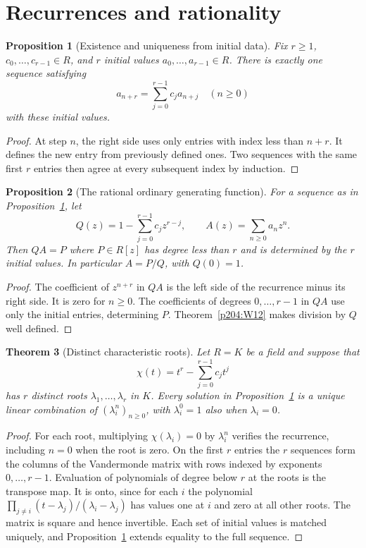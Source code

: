 \documentclass[11pt,oneside,openany]{book}
\theoremstyle{plain}
\newtheorem{theorem}{Theorem}[chapter]
\newtheorem{proposition}[theorem]{Proposition}
\theoremstyle{definition}
\theoremstyle{remark}
\begin{document}
\section{Recurrences and rationality}

\begin{proposition}[Existence and uniqueness from initial data]
\label{p204:W13}
Fix \(r\ge1\), \(c_0,\ldots,c_{r-1}\in R\), and \(r\) initial
values \(a_0,\ldots,a_{r-1}\in R\). There is exactly one sequence
satisfying
\[
 a_{n+r}=\sum_{j=0}^{r-1}c_j a_{n+j}\quad(n\ge0)
\]
with these initial values.
\end{proposition}
\begin{proof}
At step \(n\), the right side uses only entries with index
less than \(n+r\). It defines the new entry from previously
defined ones. Two sequences with the same first \(r\) entries
then agree at every subsequent index by induction.
\end{proof}

\begin{proposition}[The rational ordinary generating function]
\label{p204:W14}
For a sequence as in Proposition~\ref{p204:W13}, let
\[
 Q(z)=1-\sum_{j=0}^{r-1}c_jz^{r-j},\qquad A(z)=\sum_{n\ge0}a_nz^n.
\]
Then \(QA=P\) where \(P\in R[z]\) has degree less than \(r\)
and is determined by the \(r\) initial values.
In particular \(A=P/Q\), with \(Q(0)=1\).
\end{proposition}
\begin{proof}
The coefficient of \(z^{n+r}\) in \(QA\) is the left side
of the recurrence minus its right side. It is zero for \(n\ge0\).
The coefficients of degrees \(0,\ldots,r-1\) in \(QA\) use only
the initial entries, determining \(P\). Theorem~\ref{p204:W12}
makes division by \(Q\) well defined.
\end{proof}

\begin{theorem}[Distinct characteristic roots]\label{p204:W15}
Let \(R=K\) be a field and suppose that
\[
 \chi(t)=t^r-\sum_{j=0}^{r-1}c_jt^j
\]
has \(r\) distinct roots \(\lambda_1,\ldots,\lambda_r\) in \(K\).
Every solution in Proposition~\ref{p204:W13} is a unique linear
combination of \((\lambda_i^n)_{n\ge0}\), with \(\lambda_i^0=1\)
also when \(\lambda_i=0\).
\end{theorem}
\begin{proof}
For each root, multiplying \(\chi(\lambda_i)=0\) by
\(\lambda_i^n\) verifies the recurrence, including \(n=0\)
when the root is zero. On the first \(r\) entries the \(r\)
sequences form the columns of the Vandermonde matrix with rows
indexed by exponents \(0,\ldots,r-1\).
Evaluation of polynomials of degree below \(r\) at the roots is
the transpose map. It is onto, since for each \(i\) the polynomial
\(\prod_{j\ne i}(t-\lambda_j)/(\lambda_i-\lambda_j)\) has
values one at \(i\) and zero at all other roots. The matrix is
square and hence invertible. Each set of initial values is matched
uniquely, and Proposition~\ref{p204:W13} extends equality to the
full sequence.
\end{proof}
\end{document}
